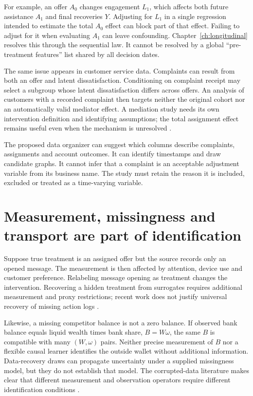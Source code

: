 For example, an offer $A_0$ changes engagement $L_1$, which affects both
future assistance $A_1$ and final recoveries $Y$. Adjusting for $L_1$
in a single regression intended to estimate the total $A_0$ effect can
block part of that effect. Failing to adjust for it when evaluating $A_1$
can leave confounding. Chapter~\ref{ch:longitudinal} resolves this through
the sequential law. It cannot be resolved by a global ``pre-treatment
features'' list shared by all decision dates.

The same issue appears in customer service data. Complaints can result from
both an offer and latent dissatisfaction. Conditioning on complaint receipt
may select a subgroup whose latent dissatisfaction differs across offers.
An analysis of customers with a recorded complaint then targets neither
the original cohort nor an automatically valid mediator effect. A mediation
study needs its own intervention definition and identifying assumptions;
the total assignment effect remains useful even when the mechanism is
unresolved \citep{hernan2020,swig2013}.

The proposed data organizer can suggest which columns describe complaints,
assignments and account outcomes. It can identify timestamps and draw
candidate graphs. It cannot infer that a complaint is an acceptable
adjustment variable from its business name. The study must retain the
reason it is included, excluded or treated as a time-varying variable.

\section{Measurement, missingness and transport are part of identification}
Suppose true treatment is an assigned offer but the source records only an
opened message. The measurement is then affected by attention, device use
and customer preference. Relabeling message opening as treatment changes
the intervention. Recovering a hidden treatment from surrogates requires
additional measurement and proxy restrictions; recent work does not justify
universal recovery of missing action logs \citep{hidden2026}.

Likewise, a missing competitor balance is not a zero balance. If observed
bank balance equals liquid wealth times bank share, $B=W\omega$, the
same $B$ is compatible with many $(W,\omega)$ pairs. Neither precise
measurement of $B$ nor a flexible causal learner identifies the outside
wallet without additional information. Data-recovery draws can propagate
uncertainty under a supplied missingness model, but they do not establish
that model. The corrupted-data literature makes clear that different
measurement and observation operators require different identification
conditions \citep{corrupt2022}.

